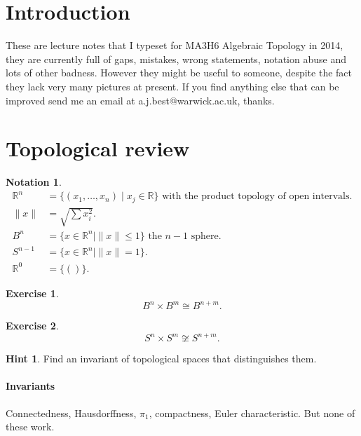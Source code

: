 \documentclass[12pt]{article}
\theoremstyle{definition}
\theoremstyle{definition}
\newtheorem*{exer}{Exercise}
\newtheorem*{nota}{Notation}
\newtheorem*{hint}{Hint}
\newcommand{\RR}{\mathbb{R}}
\begin{document}
\maketitle
\tableofcontents

\section{Introduction}
These are lecture notes that I typeset for MA3H6 Algebraic Topology in 2014, they are currently full of gaps, mistakes, wrong statements, notation abuse and lots of other badness.
However they might be useful to someone, despite the fact they lack very many pictures at present.
If you find anything else that can be improved send me an email at a.j.best@warwick.ac.uk, thanks.

\section{Topological review}

\begin{nota}
\begin{align*}
\RR^n &= \{(x_1, \ldots,x_n)\mid x_j\in\RR\}\text{ with the product topology of open intervals}.\\
\|x\| &= \sqrt{\sum x_i^2}.\\
B^n &= \{x\in \RR^n \mid \|x\| \le 1\}\text{ the }n-1\text{ sphere}.\\
S^{n-1} &= \{x\in\RR^n\mid\|x\| = 1\}.\\
\RR^0 &= \{()\}.
\end{align*}
\end{nota}


\begin{exer}
\[B^n \times B^m \cong B^{n+m}.\]
\end{exer}

\begin{exer}
\[S^n \times S^m\not\cong S^{n+m}.\]
\end{exer}

\begin{hint}
Find an invariant of topological spaces that distinguishes them.
\end{hint}

\paragraph{Invariants}
Connectedness, Hausdorffness, $\pi_1$, compactness, Euler characteristic.
But none of these work.
\end{document}
